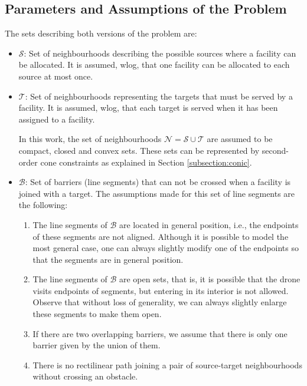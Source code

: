 \documentclass[a4paper,  review, authoryear, 1p.]{elsarticle}
\newcommand{\CV}[1]{{\color{blue}#1}}
\begin{document}
	\subsection{Parameters and Assumptions of the Problem}
	The sets describing both versions of the problem are:
	\begin{itemize}
		\item $\mathcal S$: Set of neighbourhoods describing the possible sources where a facility can be allocated. It is assumed, wlog, that one facility can be allocated to each source at most once.
		\item $\mathcal T$: Set of neighbourhoods representing the targets that must be served by a facility. It is assumed, wlog, that each target is served when it has been assigned to a facility.
		
		\CV{In this work, the set of neighbourhoods $\mathcal N=\mathcal S\cup\mathcal T$ are assumed to be compact, closed and convex sets. These sets can be represented by second-order cone constraints as explained in Section \ref{subsection:conic}.}

		\item $\mathcal B$: Set of barriers (line segments) that can not be crossed when a facility is joined with a target. The assumptions made for this set of line segments are the following:
		
		\begin{enumerate}[label=\textbf{A\arabic*},ref=\textbf{A\arabic*}]
			\item \label{A1}The line segments of $\mathcal B$ are located in general position, i.e., the endpoints of these segments are not aligned. Although it is possible to model the most general case, one can always  slightly modify one of the endpoints so that the segments are in general position.
			\item The line segments of $\mathcal B$ are open sets, that is, it is possible that the drone visits  endpoints of segments, but entering  in its interior is not allowed. Observe that without loss of generality, we can always slightly enlarge these segments to make them open.
			\item  If there are two overlapping barriers, we assume that there is only one barrier given by the union of them.
			\item \label{A4}There is no rectilinear path joining a pair of source-target neighbourhoods without crossing an obstacle.
		\end{enumerate}
		
	\end{itemize}
	
\end{document}
